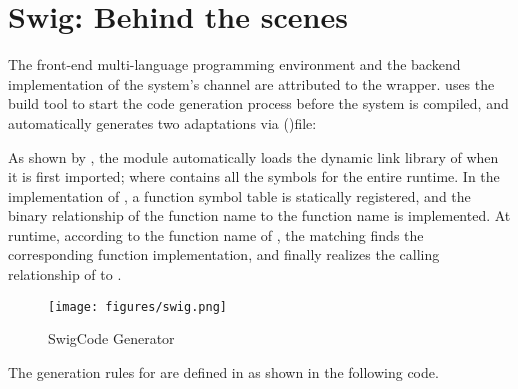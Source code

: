 \section{Swig: Behind the scenes}
\begin{content}
The front-end multi-language programming environment and the backend \cpp{} implementation of the system's channel are attributed to the  wrapper.  uses the  build tool to start the  code generation process before the system is compiled, and automatically generates two adaptations via  ()file:

\begin{enum}
\end{enum}

As shown by , the  module automatically loads the dynamic link library of  when it is first imported; where  contains all the symbols for the entire \tf{} runtime. In the implementation of , a function symbol table is statically registered, and the binary relationship of the  function name to the  function name is implemented. At runtime, according to the function name of , the matching finds the corresponding  function implementation, and finally realizes the calling relationship of  to .

\begin{figure}[H]
  \centering
  \texttt{[image: figures/swig.png]}
  \caption{SwigCode Generator}
  \label{fig:swig}
\end{figure}

The generation rules for  are defined in  as shown in the following code.


\end{content}
